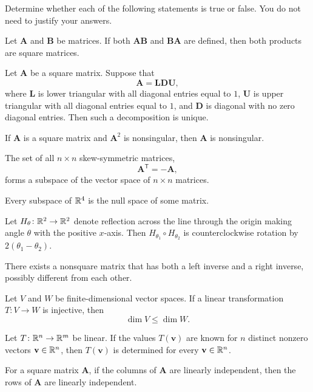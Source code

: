 \begin{problem}
Determine whether each of the following statements is true or false. You do not need to justify your answers.
\begin{problemchoices}
\item Let $\mathbf A$ and $\mathbf B$ be matrices. If both $\mathbf A\mathbf B$ and $\mathbf B\mathbf A$ are defined, then both products are square matrices.
\item Let $\mathbf A$ be a square matrix. Suppose that
\[
\mathbf A=\mathbf L\mathbf D\mathbf U,
\]
where $\mathbf L$ is lower triangular with all diagonal entries equal to $1$, $\mathbf U$ is upper triangular with all diagonal entries equal to $1$, and $\mathbf D$ is diagonal with no zero diagonal entries. Then such a decomposition is unique.
\item If $\mathbf A$ is a square matrix and $\mathbf A^2$ is nonsingular, then $\mathbf A$ is nonsingular.
\item The set of all $n\times n$ skew-symmetric matrices,
\[
\mathbf A^{\mathsf T}=-\mathbf A,
\]
forms a subspace of the vector space of $n\times n$ matrices.
\item Every subspace of $\mathbb{R}^4$ is the null space of some matrix.
\item Let $H_\theta\colon \mathbb{R}^2\to\mathbb{R}^2$ denote reflection across the line through the origin making angle $\theta$ with the positive $x$-axis. Then $H_{\theta_1}\circ H_{\theta_2}$ is counterclockwise rotation by $2(\theta_1-\theta_2)$.
\item There exists a nonsquare matrix that has both a left inverse and a right inverse, possibly different from each other.
\item Let $V$ and $W$ be finite-dimensional vector spaces. If a linear transformation $T\colon V\to W$ is injective, then
\[
\dim V\le \dim W.
\]
\item Let $T\colon \mathbb{R}^n\to\mathbb{R}^m$ be linear. If the values $T(\mathbf v)$ are known for $n$ distinct nonzero vectors $\mathbf v\in\mathbb{R}^n$, then $T(\mathbf v)$ is determined for every $\mathbf v\in\mathbb{R}^n$.
\item For a square matrix $\mathbf A$, if the columns of $\mathbf A$ are linearly independent, then the rows of $\mathbf A$ are linearly independent.
\end{problemchoices}
\end{problem}

